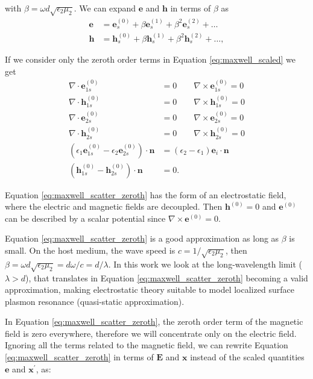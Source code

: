  with $\beta=\omega d \sqrt{\epsilon_2\mu_2}$. We can expand $\mathbf{e}$ and $\mathbf{h}$ in 
 terms of $\beta$ as
 \begin{align} \label{eq:expand}
 \mathbf{e} &= \mathbf{e}_s^{(0)} + \beta \mathbf{e}_s^{(1)} + \beta^2 \mathbf{e}_s^{(2)} + \ldots \nonumber\\
 \mathbf{h} &= \mathbf{h}_s^{(0)} + \beta \mathbf{h}_s^{(1)} + \beta^2 \mathbf{h}_s^{(2)} + \ldots,
 \end{align}
 
 If we consider only the zeroth order terms in Equation \eqref{eq:maxwell_scaled} we get
 \begin{align} \label{eq:maxwell_scatter_zeroth}
 \nabla \cdot \mathbf{e}^{(0)}_{1s} &= 0 \qquad \nabla \times \mathbf{e}^{(0)}_{1s} = 0 \nonumber \\
 \nabla \cdot \mathbf{h}^{(0)}_{1s} &= 0 \qquad \nabla \times \mathbf{h}^{(0)}_{1s} = 0 \nonumber \\
 \nabla \cdot \mathbf{e}^{(0)}_{2s} &= 0 \qquad \nabla \times \mathbf{e}^{(0)}_{2s} = 0 \nonumber \\
 \nabla \cdot \mathbf{h}^{(0)}_{2s} &= 0 \qquad \nabla \times \mathbf{h}^{(0)}_{2s} = 0 \nonumber \\
 (\epsilon_1\mathbf{e}^{(0)}_{1s} - \epsilon_2\mathbf{e}^{(0)}_{2s})\cdot\mathbf{n} &= (\epsilon_2-\epsilon_1)\mathbf{e}_i\cdot \mathbf{n} \nonumber \\(\mathbf{h}^{(0)}_{1s} - \mathbf{h}^{(0)}_{2s})\cdot \mathbf{n}&=0.
 \end{align}

Equation \eqref{eq:maxwell_scatter_zeroth} has the form of an electrostatic field, where the electric
and magnetic fields are decoupled. Then $\mathbf{h}^{(0)}=0$ and $\mathbf{e}^{(0)}$ can be described by a
scalar potential since $\nabla \times \mathbf{e}^{(0)}=0$.
 
Equation \eqref{eq:maxwell_scatter_zeroth} is a good approximation as long as $\beta$ is small. On the host medium, the wave 
speed is $c=1/\sqrt{\epsilon_2\mu_2}$, then $\beta=\omega d \sqrt{\epsilon_2\mu_2} = d\omega/c  = d/\lambda$. In this work
we look at the long-wavelength limit ($\lambda > d$), that translates in Equation \eqref{eq:maxwell_scatter_zeroth} becoming
a valid approximation, making electrostatic theory suitable to model localized surface plasmon resonance (quasi-static approximation).

In Equation \eqref{eq:maxwell_scatter_zeroth}, the zeroth order term of the magnetic field is zero
everywhere, therefore we will concentrate only on the electric field. Ignoring all the terms related 
to the magnetic field, we can rewrite Equation \eqref{eq:maxwell_scatter_zeroth} in terms of 
$\mathbf{E}$ and $\mathbf{x}$ instead of the scaled quantities $\mathbf{e}$ and
$\mathbf{x}^\prime$, as:

